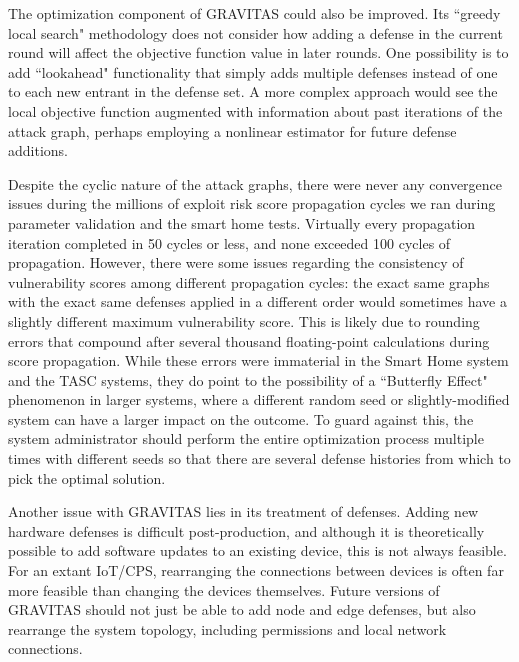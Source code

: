 \documentclass[10pt,journal,compsoc]{IEEEtran}
\begin{document}
\par The optimization component of GRAVITAS could also be improved. Its ``greedy local search" 
methodology does not consider how adding a defense in the current round 
will affect the objective function value in later rounds. One possibility is to add ``lookahead" 
functionality that simply adds multiple defenses instead of one to each new entrant in the defense set. A 
more complex approach would see the local objective function augmented with information about 
past iterations of the attack graph, perhaps employing a nonlinear estimator for future defense 
additions.

\par Despite the cyclic nature of the attack graphs, there were never any convergence issues during 
the millions of exploit risk score propagation cycles we ran during parameter validation 
and the smart home tests. Virtually every propagation iteration completed in 50 cycles or less, 
and none exceeded 100 cycles of propagation. However, there were some issues regarding the consistency 
of vulnerability scores among different propagation cycles: the exact same graphs with the exact same 
defenses applied in a different order would sometimes have a slightly different maximum vulnerability 
score. This is likely due to rounding errors that compound after several thousand floating-point 
calculations during score propagation. While these errors were immaterial in the Smart 
Home system and the TASC systems, they do point to the possibility of a ``Butterfly Effect" phenomenon in larger systems, 
where a different random seed or slightly-modified system can have a larger impact on the 
outcome. To guard against this, the system administrator should perform the entire optimization process multiple times with different seeds so that there are several defense histories from which to pick the optimal solution.

\par Another issue with GRAVITAS lies in its treatment of defenses. Adding new hardware defenses is 
difficult post-production, and although it is theoretically possible to add software updates to an 
existing device, this is not always feasible. For an extant IoT/CPS, rearranging the connections 
between devices is often far more feasible than changing the devices themselves. Future versions of 
GRAVITAS should not just be able to add node and edge defenses, but also rearrange the system 
topology, including permissions and local network connections.
\end{document}
